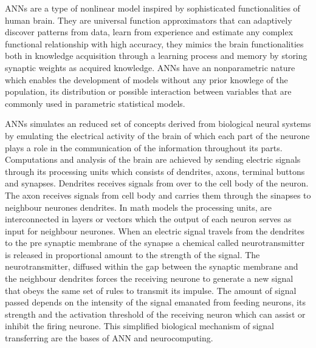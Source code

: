 ANNs are a type of nonlinear model inspired by sophisticated functionalities of human brain. They are universal function approximators that can adaptively discover patterns from data, learn from experience and estimate any complex functional relationship with high accuracy\cite{zhang1998linear, wang2003artificial}, they mimics the brain functionalities both in knowledge acquisition through a learning process and memory by storing synaptic weights as acquired knowledge\cite{ferraudo}. ANNs have an nonparametric nature which enables the development of models without any prior knowlege of the population, its distribution or possible interaction between variables that are commonly used in parametric statistical models.\cite{walczak2019artificial}

ANNs simulates an reduced set of concepts derived from biological neural systems by emulating the electrical activity of the brain of which each part of the neurone plays a role in the communication of the information throughout its parts. Computations and analysis of the brain are achieved by sending electric signals through its processing units which consists of dendrites, axons, terminal buttons and synapses\cite{krogh2008artificial}. Dendrites receives signals from over to the cell body of the neuron. The axon receives signals from cell body and carries them through the sinapses to neighbour neurones dendrites. In math models the processing units, are interconnected in layers or vectors which the output of each neuron serves as input for neighbour neurones. When an electric signal travels from the dendrites to the pre synaptic membrane of the synapse a chemical called neurotransmitter is released in proportional amount to the strength of the signal. The neurotransmitter, diffused within the gap between the synaptic membrane and the neighbour dendrites forces the receiving neurone to generate a new signal that obeys the same set of rules to transmit its impulse\cite{basheer2000artificial}. The amount of signal passed depends on the intensity of the signal emanated from feeding neurons, its strength and the activation threshold of the receiving neuron which can assist or inhibit the firing neurone. This simplified biological mechanism of signal transferring are the bases of ANN and neurocomputing.

